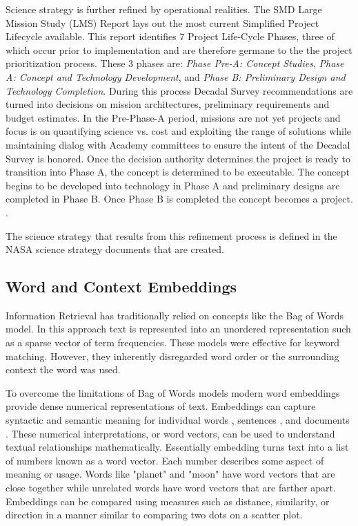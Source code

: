 \documentclass[preprint,12pt]{elsarticle}
\begin{document}
Science strategy is further refined by operational realities. The SMD Large Mission Study (LMS) Report lays out the most current Simplified Project Lifecycle available. This report identifies 7 Project Life-Cycle Phases, three of which occur prior to implementation and are therefore germane to the the project prioritization process. These 3 phases are: \emph{Phase Pre-A: Concept Studies}, \emph{Phase A: Concept and Technology Development}, and \emph{Phase B: Preliminary Design and Technology Completion}. During this process Decadal Survey recommendations are turned into decisions on mission architectures, preliminary requirements and budget estimates. In the Pre-Phase-A period, missions are not yet projects and focus is on quantifying science vs. cost and exploiting the range of solutions while maintaining dialog with Academy committees to ensure the intent of the Decadal Survey is honored. Once the decision authority determines the project is ready to transition into Phase A, the concept is determined to be executable. The concept begins to be developed into technology in Phase A and preliminary designs are completed in Phase B. Once Phase B is completed the concept becomes a project. \cite{NASA2020_LMS_study} \cite{wessen2013ConceptMaturity}.

The science strategy that results from this refinement process is defined in the NASA science strategy documents that are created.

\subsection{Word and Context Embeddings}
Information Retrieval has traditionally relied on concepts like the Bag of Words model\cite{harris1954}. In this approach text is represented into an unordered representation such as a sparse vector of term frequencies. These models were effective for keyword matching. However, they inherently disregarded word order or the surrounding context the word was used. 

To overcome the limitations of Bag of Words models modern word embeddings provide dense numerical representations of text. Embeddings can capture syntactic and semantic meaning for individual words \cite{mikolov2013_reps_of_words}, sentences \cite{reimers2019sentencebertsentenceembeddingsusing}, and documents \cite{wu_2018_doc_embeds}. These numerical interpretations, or word vectors, can be used to understand textual relationships mathematically. Essentially embedding turns text into a list of numbers known as a word vector. Each number describes some aspect of meaning or usage. Words like "planet" and "moon" have word vectors that are close together while unrelated words have word vectors that are farther apart. Embeddings can be compared using measures such as distance, similarity, or direction in a manner similar to comparing two dots on a scatter plot.
 
\end{document}
